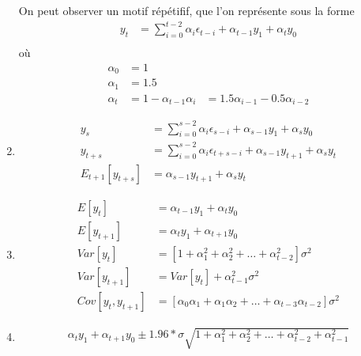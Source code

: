 \begin{solution}{2.8}
\begin{enumerate}
  On peut observer un motif répétifif, que l'on représente sous la forme
  \begin{align*}
    y_t &= \sum_{i=0}^{t-2} \alpha_i\epsilon_{t-i} + \alpha_{t-1}y_1 + \alpha_t y_0 \\
  \end{align*}
  où
  \begin{align*}
    \alpha_0 &= 1\\
    \alpha_1 &= 1.5\\
    \alpha_t &= 1-\alpha_{t-1}
    \alpha_i &= 1.5 \alpha_{i-1} - 0.5 \alpha_{i-2}
  \end{align*}
\item
  \begin{align*}
    y_s &= \sum_{i=0}^{s-2} \alpha_i\epsilon_{s-i} + \alpha_{s-1}y_1 + \alpha_s y_0 \\
    y_{t+s} &= \sum_{i=0}^{s-2} \alpha_i\epsilon_{t+s-i} + \alpha_{s-1}y_{t+1} + \alpha_s y_t \\
    E_{t+1}\left[y_{t+s}\right] &= \alpha_{s-1} y_{t+1} + \alpha_s y_t
  \end{align*}

\item
  \begin{align*}
    E\left[y_t\right] &= \alpha_{t-1} y_1 + \alpha_t y_0 \\
    E\left[y_{t+1}\right] &= \alpha_{t} y_1 + \alpha_{t+1} y_0 \\
    Var\left[y_t\right] &= \left[1+\alpha_1^2 + \alpha_2^2 + \ldots + \alpha_{t-2}^2\right]\sigma^2 \\
    Var\left[y_{t+1}\right] &= Var\left[y_t\right] + \alpha_{t-1}^2 \sigma^2 \\
    Cov\left[y_{t},y_{t+1}\right] &= \left[\alpha_0\alpha_1 + \alpha_1\alpha_2 + \ldots + \alpha_{t-3}\alpha_{t-2}\right] \sigma^2
  \end{align*}
\item
  \begin{align*}
    \alpha_{t} y_1 + \alpha_{t+1} y_0 \pm 1.96 * \sigma \sqrt{1+\alpha_1^2 + \alpha_2^2 + \ldots + \alpha_{t-2}^2+\alpha_{t-1}^2}
  \end{align*}
\end{enumerate}
\end{solution}
